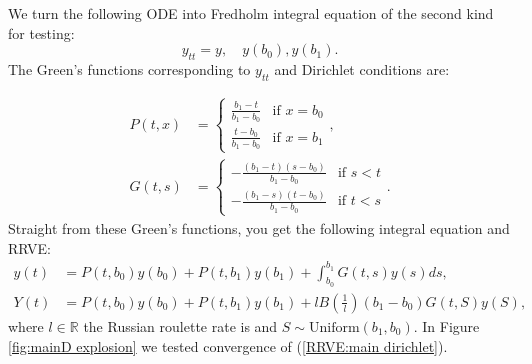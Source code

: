 \documentclass[a4paper,12pt]{article}
\begin{document}
\begin{example}[Dirichlet $y_{tt}=y$] \label{main dirichlet}
    We turn the following ODE into Fredholm integral equation of
    the second kind for testing:
    \begin{equation} \label{eq:main dirichlet}
        y_{tt}=y, \quad y(b_{0}),y(b_{1}).
    \end{equation}
    The Green's functions corresponding to $y_{tt}$ and Dirichlet conditions are:

    \begin{align}
        P(t,x) & = \begin{cases}
                       \frac{b_{1}-t}{b_{1}-b_{0}} & \text{if } x = b_{0} \\
                       \frac{t-b_{0}}{b_{1}-b_{0}} & \text{if } x = b_{1}
                   \end{cases},       \\
        G(t,s) & = \begin{cases}
                       -\frac{(b_{1}-t)(s-b_{0})}{b_{1}-b_{0}} & \text{if } s<t \\
                       -\frac{(b_{1}-s)(t-b_{0})}{b_{1}-b_{0}} & \text{if } t<s
                   \end{cases}.
    \end{align}
    Straight from these Green's functions, you get the following integral equation and RRVE:
    \begin{align} \label{inteq:main dirichlet}
        y(t) & = P(t,b_{0}) y(b_{0}) + P(t,b_{1}) y(b_{1}) +
        \int_{b_{0}}^{b_{1}} G(t,s)y(s) ds,                  \\
        Y(t) & = P(t,b_{0}) y(b_{0}) + P(t,b_{1}) y(b_{1})
        + l B\left(\frac{1}{l} \right)(b_{1}-b_{0}) G(t,S)y(S) , \label{RRVE:main dirichlet}
    \end{align}
    where $l \in \mathbb{R}$ the Russian roulette rate is and
    $S \sim \text{Uniform}(b_{1},b_{0})$. In Figure \ref{fig:mainD explosion}
    we tested convergence of (\ref{RRVE:main dirichlet}).

\end{example}
\end{document}
